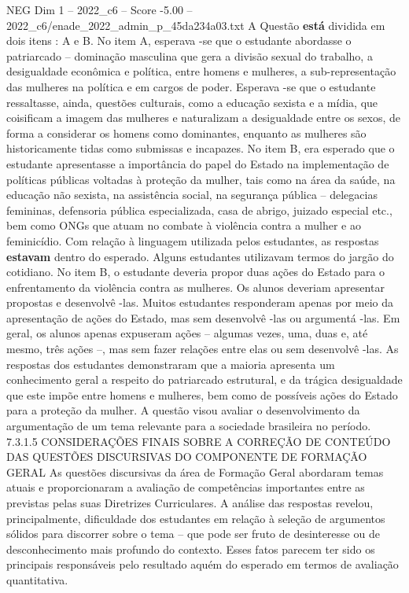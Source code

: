 \begin{textsample}{NEG Dim 1 – 2022\_c6 – Score -5.00 – 2022\_c6/enade\_2022\_admin\_p\_45da234a03.txt}
A Questão \textbf{está} dividida em dois itens : A e B.
No item A, esperava -se que o estudante abordasse o patriarcado – dominação masculina que gera a divisão sexual do trabalho, a desigualdade econômica e política, entre homens e mulheres, a sub-representação das mulheres na política e em cargos de poder.
Esperava -se que o estudante ressaltasse, ainda, questões culturais, como a educação sexista e a mídia, que coisificam a imagem das mulheres e naturalizam a desigualdade entre os sexos, de forma a considerar os homens como dominantes, enquanto as mulheres são historicamente tidas como submissas e incapazes.
No item B, era esperado que o estudante apresentasse a importância do papel do Estado na implementação de políticas públicas voltadas à proteção da mulher, tais como na área da saúde, na educação não sexista, na assistência social, na segurança pública – delegacias femininas, defensoria pública especializada, casa de abrigo, juizado especial etc., bem como ONGs que atuam no combate à violência contra a mulher e ao feminicídio.
Com relação à linguagem utilizada pelos estudantes, as respostas \textbf{estavam} dentro do esperado.
Alguns estudantes utilizavam termos do jargão do cotidiano.
No item B, o estudante deveria propor duas ações do Estado para o enfrentamento da violência contra as mulheres.
Os alunos deveriam apresentar propostas e desenvolvê -las.
Muitos estudantes responderam apenas por meio da apresentação de ações do Estado, mas sem desenvolvê -las ou argumentá -las.
Em geral, os alunos apenas expuseram ações – algumas vezes, uma, duas e, até mesmo, três ações –, mas sem fazer relações entre elas ou sem desenvolvê -las.
As respostas dos estudantes demonstraram que a maioria apresenta um conhecimento geral a respeito do patriarcado estrutural, e da trágica desigualdade que este impõe entre homens e mulheres, bem como de possíveis ações do Estado para a proteção da mulher.
A questão visou avaliar o desenvolvimento da argumentação de um tema relevante para a sociedade brasileira no período. 7.3.1.5 CONSIDERAÇÕES FINAIS SOBRE A CORREÇÃO DE CONTEÚDO DAS QUESTÕES DISCURSIVAS DO COMPONENTE DE FORMAÇÃO GERAL As questões discursivas da área de Formação Geral abordaram temas atuais e proporcionaram a avaliação de competências importantes entre as previstas pelas suas Diretrizes Curriculares.
A análise das respostas revelou, principalmente, dificuldade dos estudantes em relação à seleção de argumentos sólidos para discorrer sobre o tema – que pode ser fruto de desinteresse ou de desconhecimento mais profundo do contexto.
Esses fatos parecem ter sido os principais responsáveis pelo resultado aquém do esperado em termos de avaliação quantitativa.

\end{textsample}
